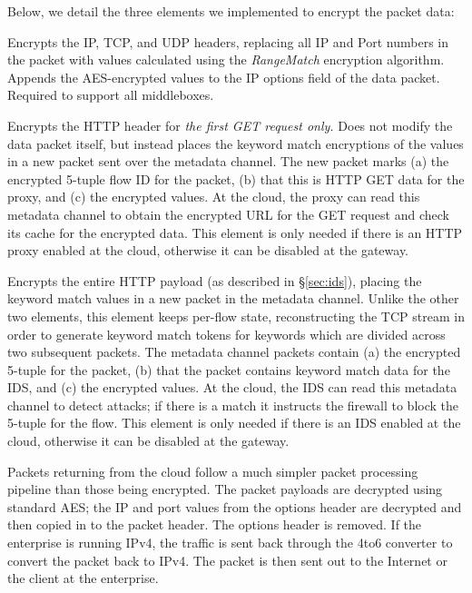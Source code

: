 Below, we detail the three elements we implemented to encrypt the packet data:

 Encrypts the IP, TCP, and UDP headers, replacing all IP and Port numbers in the packet with values calculated using the {\it RangeMatch} encryption algorithm. Appends the AES-encrypted values to the IP options field of the data packet.
Required to support all middleboxes. 

 Encrypts the HTTP header for {\it the first GET request only.} Does not modify the data packet itself, but instead places the keyword match encryptions of the values in a new packet sent over the metadata channel. 
The new packet marks (a) the encrypted 5-tuple flow ID for the packet, (b) that this is HTTP GET data for the proxy, and (c) the encrypted values. At the cloud, the proxy can read this metadata channel to obtain the encrypted URL for the GET request and check its cache for the encrypted data. This element is only needed if there is an HTTP proxy enabled at the cloud, otherwise it can be disabled at the gateway.

 Encrypts the entire HTTP payload (as described in \S\ref{sec:ids}), placing the keyword match values in a new packet in the metadata channel. Unlike the other two elements, this element keeps per-flow state, reconstructing the TCP stream in order to generate keyword match tokens for keywords which are divided across two subsequent packets.  The metadata channel packets contain (a) the encrypted 5-tuple for the packet, (b) that the packet contains keyword match data for the IDS, and (c) the encrypted values. At the cloud, the IDS can read this metadata channel to detect attacks; if there is a match it instructs the firewall to block the 5-tuple for the flow. This element is only needed if there is an IDS enabled at the cloud, otherwise it can be disabled at the gateway.


 Packets returning from the cloud follow a much simpler packet processing pipeline than those being encrypted.
The packet payloads are decrypted using standard AES; the IP and port values from the options header are decrypted and then copied in to the packet header. The options header is removed.
If the enterprise is running IPv4, the traffic is sent back through the 4to6 converter to convert the packet back to IPv4.
The packet is then sent out to the Internet or the client at the enterprise.


